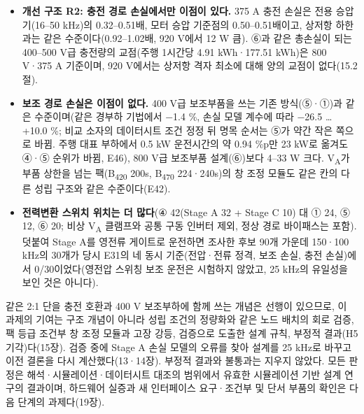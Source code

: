 \begin{itemize}
\begin{itemize}
\item \textbf{개선 구조 R2: 충전 경로 손실에서만 이점이 있다.} 375 A 충전 손실은 전용 승압기(16–50 kHz)의 0.32–0.51배, 모터 승압 기준점의 0.50–0.51배이고, 상저항 하한과는 같은 수준이다(0.92–1.02배, 920 V에서 12 W 큼). ⑥과 같은 총손실이 되는 400–500 V급 충전량의 교점(주행 1시간당 4.91 kWh·177.51 kWh)은 800 V·375 A 기준이며, 920 V에서는 상저항 격자 최소에 대해 양의 교점이 없다(15.2절).
\item \textbf{보조 경로 손실은 이점이 없다.} 400 V급 보조부품을 쓰는 기존 방식(⑤·①)과 같은 수준이며(같은 경부하 기법에서 −1.4 \%, 손실 모델 계수에 따라 −26.5 … +10.0 \%; 비교 소자의 데이터시트 조건 정정 뒤 명목 순서는 ⑤가 약간 작은 쪽으로 바뀜. 주행 대표 부하에서 0.5 kW 운전시간의 약 0.94 \%p만 23 kW로 옮겨도 ④·⑤ 순위가 바뀜, E46), 800 V급 보조부품 설계(⑥)보다 4–33 W 크다. V\textsubscript{A}가 부품 상한을 넘는 팩(B\textsubscript{420} 200s, B\textsubscript{470} 224·240s)의 창 조정 모듈도 같은 칸의 다른 성립 구조와 같은 수준이다(E42).
\item \textbf{전력변환 스위치 위치는 더 많다}(④ 42(Stage A 32 + Stage C 10) 대 ① 24, ⑤ 12, ⑥ 20; 비상 V\textsubscript{A} 클램프와 공통 구동 인버터 제외, 정상 경로 바이패스는 포함). 덧붙여 Stage A를 영전류 게이트로 운전하면 조사한 후보 90개 가운데 150·100 kHz의 30개가 당시 E31의 네 동시 기준(전압·전류 정격, 보조 손실, 충전 손실)에서 0/30이었다(영전압 스위칭 보조 운전은 시험하지 않았고, 25 kHz의 유일성을 보인 것은 아니다).
\end{itemize}
\end{itemize}

같은 2:1 단을 충전 호환과 400 V 보조부하에 함께 쓰는 개념은 선행이 있으므로, 이 과제의 기여는 구조 개념이 아니라 성립 조건의 정량화와 같은 노드 배치의 회로 검증, 팩 등급 조건부 창 조정 모듈과 고장 강등, 검증으로 도출한 설계 규칙, 부정적 결과(H5 기각)다(15장). 검증 중에 Stage A 손실 모델의 오류를 찾아 설계를 25 kHz로 바꾸고 이전 결론을 다시 계산했다(13·14장). 부정적 결과와 불통과는 지우지 않았다. 모든 판정은 해석·시뮬레이션·데이터시트 대조의 범위에서 유효한 시뮬레이션 기반 설계 연구의 결과이며, 하드웨어 실증과 새 인터페이스 요구·조건부 및 단서 부품의 확인은 다음 단계의 과제다(19장).
